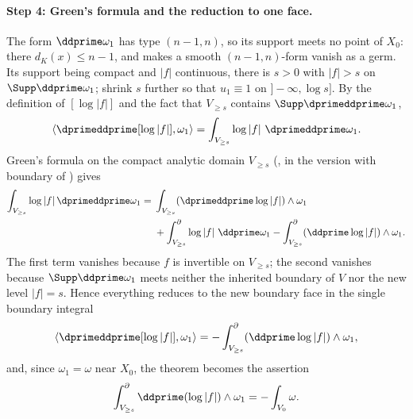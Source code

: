 \paragraph{Step 4: Green's formula and the reduction to one face.}
The form $\ddprime\omega_1$ has type $(n-1,n)$, so its support meets no
point of $X_0$: there $d_K(x)\leq n-1$, and
\cite[Proposition~15.2.1(b)]{CLD25} makes a smooth $(n-1,n)$-form vanish
as a germ. Its support being compact and $|f|$ continuous,
there is $s>0$ with $|f|>s$ on $\Supp\ddprime\omega_1$; shrink $s$ further so
that $u_1\equiv1$ on $]-\infty,\log s]$.  By the definition of $[\log|f|]$
and the fact that $V_{\ge s}$ contains $\Supp\dprimeddprime\omega_1$,
\[
 \langle\dprimeddprime[\log|f|],\omega_1\rangle
 =\int_{V_{\ge s}}\log|f|\ \dprimeddprime\omega_1 .
\]
Green's formula on the compact analytic domain $V_{\ge s}$
(, in the version with boundary of
\cite[Proposition~5.11.1]{CLD25}) gives
\[
 \begin{aligned}
  \int_{V_{\ge s}}\log|f|\,\dprimeddprime\omega_1
   ={}&\int_{V_{\ge s}}(\dprimeddprime\log|f|)\wedge\omega_1\\
     &+\int_{V_{\ge s}}^{\partial}\log|f|\ \ddprime\omega_1
      -\int_{V_{\ge s}}^{\partial}
       (\ddprime\log|f|)\wedge\omega_1 .
 \end{aligned}
\]
The first term vanishes because $f$ is invertible on $V_{\ge s}$; the second
vanishes because $\Supp\ddprime\omega_1$ meets neither the inherited
boundary of $V$ nor the new level $|f|=s$. Hence everything reduces to the
new boundary face in the single boundary
integral
\[
 \langle\dprimeddprime[\log|f|],\omega_1\rangle
 =-\int^{\partial}_{V_{\ge s}}(\ddprime\log|f|)\wedge\omega_1 ,
\]
and, since $\omega_1=\omega$ near $X_0$, the theorem becomes the assertion
\begin{equation}
\label{eq:ch15-pl-face}
 \int^{\partial}_{V_{\ge s}}\ddprime(\log|f|)\wedge\omega_1
 =-\int_{V_0}\omega .
\end{equation}

